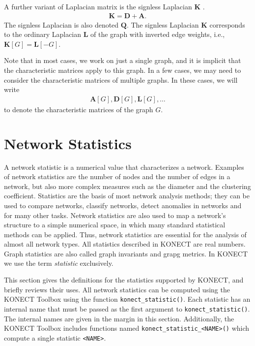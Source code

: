 \documentclass{article}
\begin{document}
A further variant of Laplacian matrix is the signless Laplacian $\mathbf
K$ \citep{b900}. 
\begin{align}
  \mathbf K = \mathbf D + \mathbf A. 
\end{align}
The signless Laplacian is also denoted $\mathbf Q$. 
The signless Laplacian $\mathbf K$ corresponds to the ordinary Laplacian
$\mathbf L$ of the graph with inverted edge weights, i.e., $\mathbf K[G] =
\mathbf L[-G]$. 

Note that in most cases, we work on just a single graph, and it is
implicit that the characteristic matrices apply to this graph.  In a few
cases, we may need to consider the characteristic matrices of multiple
graphs.  In these cases, we will write
\begin{align*}
  \mathbf A[G], \mathbf D[G], \mathbf L[G], \dotsc
\end{align*}
to denote the characteristic matrices of the graph $G$. 

\section{Network Statistics}
\label{sec:statistics}
A network statistic is a numerical value that characterizes a network.
Examples of network statistics are the number of nodes and the number of
edges in a network, but also more complex measures such as the diameter and the
clustering coefficient.  
Statistics are the basis of most network analysis methods; they can be
used to compare networks, classify networks, detect anomalies in
networks and for many other tasks.  Network statistics are also used to
map a network's structure 
to a simple numerical space, in which many standard statistical
methods can be applied.  Thus, network statistics are essential for the
analysis of almost all network types. 
All statistics described in KONECT are real numbers.
Graph statistics are also called graph invariants and grapg metrics.  In
KONECT we use the term \emph{statistic} exclusively. 

This section gives the definitions for the statistics supported by
KONECT, and briefly reviews their uses.  
All network statistics can be computed using the KONECT Toolbox using
the function \texttt{konect\_statistic()}. Each statistic has an
internal name that must be passed as the first argument to
\texttt{konect\_statistic()}.  The internal names are given in the
margin in this section. 
Additionally, the KONECT Toolbox includes functions named
\texttt{konect\_statistic\_<NAME>()} which compute a single statistic
\texttt{<NAME>}. 
\end{document}
